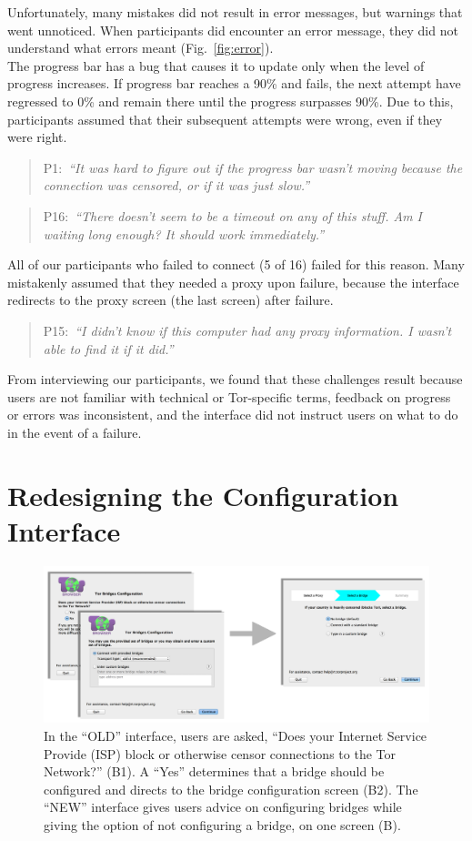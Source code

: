 \documentclass[USenglish,oneside,twocolumn]{article}
\newcommand{\pquote}[2]{
\begin{quotation}
\noindent #1:~\textit{``#2''}
\end{quotation}
}
\begin{document}
Unfortunately, many mistakes did not result in error messages, but warnings that went unnoticed.
When participants did encounter an error message, they did not understand what errors meant (Fig.~\ref{fig:error}).\\

The progress bar has a bug that causes it to update only when the level of progress increases.
If progress bar reaches a 90\% and fails, the next attempt have regressed to 0\% and remain there until the progress surpasses 90\%. Due to this, participants assumed that their subsequent attempts were wrong, even if they were right.
\pquote{P1}{It was hard to figure out if the progress bar wasn't moving because the connection was censored, or if it was just slow.}
\pquote{P16}{There doesn't seem to be a timeout on any of this stuff. Am I waiting long enough? It should work immediately.}

All of our participants who failed to connect (5 of 16) failed for this reason. Many mistakenly assumed that they needed a proxy upon failure, because the interface redirects to the proxy screen (the last screen) after failure. 

\pquote{P15}{I didn't know if this computer had any proxy information. I wasn't able to find it if it did.}

From interviewing our participants, we found that these challenges result because users are not familiar with technical or Tor-specific terms, feedback on progress or errors was inconsistent, and the interface did not instruct users on what to do in the event of a failure. 

\section{Redesigning the Configuration Interface}
\label{redesign} 

 \begin{figure}[t]
	\centering
		\includegraphics[width=.8\textwidth]{bridge-screens.pdf} 
		\caption{In the ``OLD'' interface, users are asked, ``Does your Internet Service Provide (ISP) block or 
		otherwise censor connections to the Tor Network?'' (B1). A ``Yes'' determines that a bridge should 
		be configured and directs to the bridge configuration screen (B2). 
		The ``NEW'' interface gives users advice on configuring bridges
		while giving the option of not configuring a bridge, on one screen (B).} 
\end{figure} 
\end{document}
